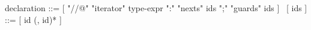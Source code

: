 \begin{syntax}
  declaration ::= [ "//@" "iterator" type-expr ":" "nexts" ids ";" "guards" ids ]
  \
  [ ids ] ::= [ id (, id)* ]
\end{syntax}

